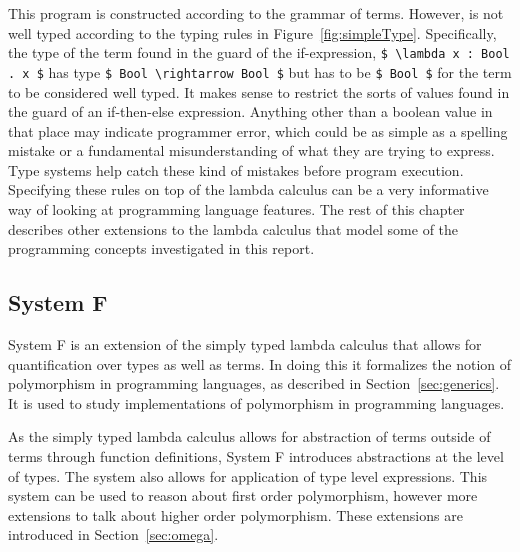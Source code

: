 This program is constructed according to the grammar of terms. However, is not
well typed according to the typing rules in Figure~\ref{fig:simpleType}. 
Specifically, the type of the term found in the guard of the if-expression,
\lstinline[mathescape]{$ \lambda x : Bool . x $} has type
\lstinline[mathescape]{$ Bool \rightarrow Bool $} but has to be
\lstinline[mathescape]{$ Bool $} for the term to be considered well typed.
It makes sense to restrict the sorts of values found in the guard of an if-then-else
expression. Anything other than a boolean value in that place may indicate
programmer error, which could be as simple as a spelling mistake or a fundamental
misunderstanding of what they are trying to express. Type systems help catch
these kind of mistakes before program execution. Specifying these rules on top
of the lambda calculus can be a very informative way of looking at programming
language features. The rest of this chapter describes other extensions to the
lambda calculus that model some of the programming concepts investigated in
this report.

\subsection{System F}\label{sec:systemF}
System F is an extension of the simply typed lambda calculus \cite{tapl} that
allows for quantification over types as well as terms. In doing this it
formalizes the notion of polymorphism in programming languages, as described in
Section~\ref{sec:generics}. It is used to study implementations of polymorphism
in programming languages.

As the simply typed lambda calculus allows for abstraction of terms outside of
terms through function definitions, System F introduces abstractions at the
level of types. The system also allows for application of type level
expressions. This system can be used to reason about first order polymorphism,
however more extensions to talk about higher order polymorphism. These extensions
are introduced in Section~\ref{sec:omega}.

